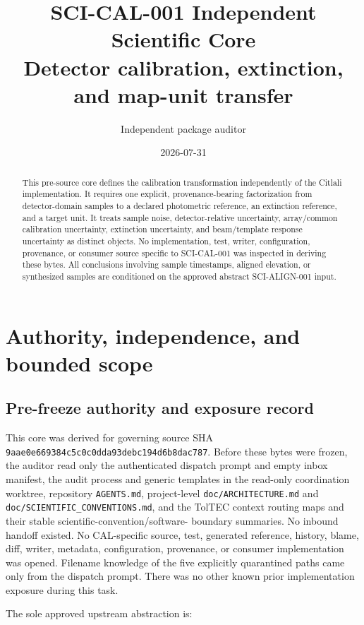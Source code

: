 \documentclass[11pt]{article}
\title{SCI-CAL-001 Independent Scientific Core\\
\large Detector calibration, extinction, and map-unit transfer}
\author{Independent package auditor}
\date{2026-07-31}
\newcommand{\code}[1]{\nolinkurl{#1}}
\begin{document}
\maketitle

\begin{abstract}
This pre-source core defines the calibration transformation independently of
the Citlali implementation.  It requires one explicit, provenance-bearing
factorization from detector-domain samples to a declared photometric reference,
an extinction reference, and a target unit.  It treats sample noise,
detector-relative uncertainty, array/common calibration uncertainty,
extinction uncertainty, and beam/template response uncertainty as distinct
objects.  No implementation, test, writer, configuration, provenance, or
consumer source specific to SCI-CAL-001 was inspected in deriving these bytes.
All conclusions involving sample timestamps, aligned elevation, or synthesized
samples are conditioned on the approved abstract SCI-ALIGN-001 input.
\end{abstract}

\section{Authority, independence, and bounded scope}

\subsection{Pre-freeze authority and exposure record}

This core was derived for governing source SHA
\code{9aae0e669384c5c0c0dda93debc194d6b8dac787}.  Before these bytes were
frozen, the auditor read only the authenticated dispatch prompt and empty inbox
manifest, the audit process and generic templates in the read-only coordination
worktree, repository \code{AGENTS.md}, project-level
\code{doc/ARCHITECTURE.md} and \code{doc/SCIENTIFIC_CONVENTIONS.md}, and the
TolTEC context routing maps and their stable scientific-convention/software-
boundary summaries.  No inbound handoff existed.  No CAL-specific source,
test, generated reference, history, blame, diff, writer, metadata,
configuration, provenance, or consumer implementation was opened.  Filename
knowledge of the five explicitly quarantined paths came only from the dispatch
prompt.  There was no other known prior implementation exposure during this
task.

The sole approved upstream abstraction is:
\end{document}
